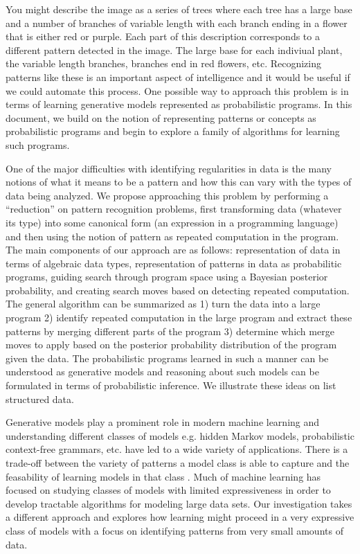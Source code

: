 \documentclass[a4paper,10pt]{article}
\begin{document}
You might describe the image as a series of trees where each tree has a large base and a number of branches of variable length with each branch ending in a flower that is either red or purple.  Each part of this description corresponds to a different pattern detected in the image.  The large base for each indiviual plant, the variable length branches, branches end in red flowers, etc.  Recognizing patterns like these is an important aspect of intelligence and it would be useful if we could automate this process.  One possible way to approach this problem is in terms of learning generative models represented as probabilistic programs.  In this document, we build on the notion of representing patterns or concepts as probabilistic programs \cite{A.Stuhlmueller:2010:6d11a} and begin to explore a family of algorithms for learning such programs.

One of the major difficulties with identifying regularities in data is the many notions of what it means to be a pattern and how this can vary with the types of data being analyzed.   We propose approaching this problem by performing a ``reduction'' on pattern recognition problems, first transforming data (whatever its type) into some canonical form (an expression in a programming language) and then using the notion of pattern as repeated computation in the program.  The main components of our approach are as follows: representation of data in terms of algebraic data types, representation of patterns in data as probabilitic programs, guiding search through program space using a Bayesian posterior probability, and creating search moves based on detecting repeated computation.  The general algorithm can be summarized as 1) turn the data into a large program 2) identify repeated computation in the large program and extract these patterns by merging different parts of the program 3) determine which merge moves to apply based on the posterior probability distribution of the program given the data.  The probabilistic programs learned in such a manner can be understood as generative models and reasoning about such models can be formulated in terms of probabilistic inference.  We illustrate these ideas on list structured data.  

Generative models play a prominent role in modern machine learning and understanding different classes of models e.g. hidden Markov models, probabilistic context-free grammars, etc. have led to a wide variety of applications.  There is a trade-off between the variety of patterns a model class is able to capture and the feasability of learning models in that class \cite{Russell2003}.  Much of machine learning has focused on studying classes of models with limited expressiveness in order to develop tractable algorithms for modeling large data sets.  Our investigation takes a different approach and explores how learning might proceed in a very expressive class of models with a focus on identifying patterns from very small amounts of data.  
\end{document}
